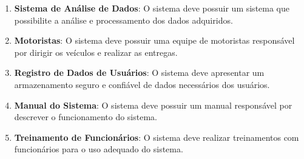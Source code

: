 \begin{enumerate}
	\item \textbf{Sistema de Análise de Dados}: O sistema deve possuir um sistema que possibilite a análise e processamento dos dados adquiridos.
	
	\item \textbf{Motoristas}: O sistema deve possuir uma equipe de motoristas responsável por dirigir os veículos e realizar as entregas.
	
	\item \textbf{Registro de Dados de Usuários}: O sistema deve apresentar um armazenamento seguro e confiável de dados necessários dos usuários.
	
	\item \textbf{Manual do Sistema}: O sistema deve possuir um manual responsável por descrever o funcionamento do sistema.
	
	\item \textbf{Treinamento de Funcionários}: O sistema deve realizar treinamentos com funcionários para o uso adequado do sistema.
\end{enumerate}

